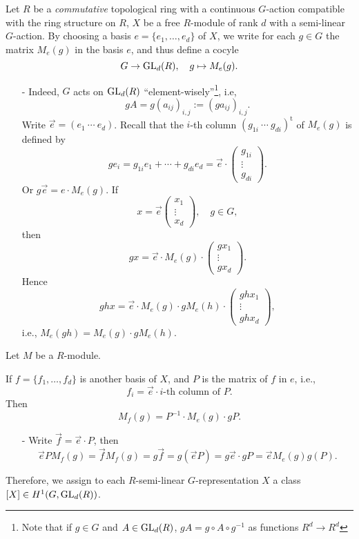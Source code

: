 \begin{example}
    Let $R$ be a \textit{commutative} topological ring with a continuous $G$-action compatible with the ring structure on $R$,
    $X$ be a free $R$-module of rank $d$ with a semi-linear $G$-action.
By choosing a basis $e = \{e_1, \dots, e_d\}$ of $X$,
we write for each $g\in G$ the matrix $M_e(g)$ in the basis $e$, and thus define a cocyle \[G\to\operatorname{GL}_d(R),\quad g\mapsto M_e(g).\]
\begin{itemize}
\item[-]Indeed, $G$ acts on $\operatorname{GL}_d(R)$ ``element-wisely''\footnote{
    Note that if $g\in G$ and $A\in\operatorname{GL}_d(R)$, $gA = g\circ A\circ g^{-1}$ as functions $R^d\to R^d$
}, i.e, \[gA = g (a_{ij})_{i, j} := (ga_{ij})_{i, j}.\]
Write \(\vec{e} = (e_1\ \cdots\ e_d) \).
Recall that the $i$-th column $(g_{1i}\ \cdots\ g_{di})^{\mathrm t}$ of $M_e(g)$ is defined by
\[ge_i = g_{1i}e_1 + \cdots + g_{di}e_d = \vec e
\cdot \begin{pmatrix}
    g_{1i}\\ \vdots \\ g_{di}
\end{pmatrix}.\]
Or $g\vec{e} = e\cdot M_e(g)$.
If \[x = \vec{e}\begin{pmatrix}
    x_1\\ \vdots\\ x_d
\end{pmatrix},\quad g\in G,\]
then \[gx =\vec{e} \cdot M_e(g)\cdot \begin{pmatrix}
    gx_1\\ \vdots \\ gx_d
\end{pmatrix}.\]
Hence \[ghx = \vec{e}\cdot M_e(g)\cdot gM_e(h)\cdot\begin{pmatrix}
    ghx_1\\ \vdots\\ ghx_d
\end{pmatrix},\]
i.e., $M_e(gh) = M_e(g)\cdot gM_e(h)$.

\end{itemize}
Let $M$ be a $R$-module.


If $f = \{f_1, \dots, f_d\}$ is another basis of $X$,
and $P$ is the matrix of $f$ in $e$, i.e., \[f_i = \vec{e}\cdot i\text{-th column of }P.
\]
Then \[M_f(g) = P^{-1}\cdot M_e(g)\cdot gP.\]
\begin{itemize}
\item[-]
Write $\vec{f} = \vec{e}\cdot P$,
then \[\vec{e}PM_f(g) =\vec{f}M_f(g) = g\vec{f} = g(\vec{e}P) = g\vec{e}\cdot gP = \vec{e}M_e(g)g(P).\]
\end{itemize}
Therefore, we assign to each $R$-semi-linear $G$-representation $X$ a class $[X]\in H^1(G, \operatorname{GL}_d(R))$.
\end{example}

